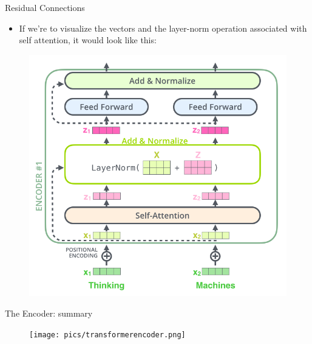 \documentclass[handout]{beamer}
\begin{document}
\begin{frame}{Residual Connections}
\begin{scriptsize}
\begin{itemize}

\item If we’re to visualize the vectors and the layer-norm operation associated with self attention, it would look like this:

\end{itemize}

\end{scriptsize}


 \begin{figure}[h]
        	\includegraphics[scale = 0.3]{pics/transformer_resideual_layer_norm_2.png}
        \end{figure}


\end{frame}



\begin{frame}{The Encoder: summary}

     \begin{figure}[h]
        	\texttt{[image: pics/transformerencoder.png]}
        \end{figure}  


\end{frame}
\end{document}
